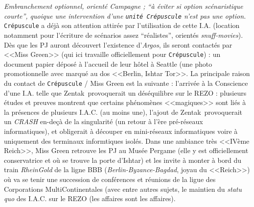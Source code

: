 \documentclass[11pt,twoside,a4paper]{article}
\begin{document}
\emph{Embranchement optionnel, orient{\'e} Campagne ; ``{\`a} {\'e}viter si option sc{\'e}naristique courte'', quoique une intervention d'une \texttt{unit{\'e} Cr{\'e}puscule} n'est pas une option. } \texttt{Cr{\'e}puscule} a d{\'e}j{\`a} son attention attir{\'e}e par l'utilisation de cette I.A. (location notamment pour l'{\'e}criture de sc{\'e}narios assez ``r{\'e}alistes'', orient{\'e}s \emph{snuff-movies}). D{\`e}s que les PJ auront d{\'e}couvert l'existence d'\emph{Argos}, ils seront contact{\'e}s par <<Miss Green>> (qui ici travaille officiellement pour \texttt{Cr{\'e}puscule}) : un document papier d{\'e}pos{\'e} {\`a} l'accueil de leur h{\^o}tel {\`a} Seattle (une photo promotionnelle avec marqu{\'e} au dos <<Berlin, Ishtar Tor>>. La principale raison du contact de \texttt{Cr{\'e}puscule} / Miss Green est la suivante : l'arriv{\'e}e {\`a} la Conscience d'une I.A. telle que Zentak~\texttrademark  provoquerait un d{\'e}s{\'e}quilibre sur le REZO : plusieurs {\'e}tudes et preuves montrent que certains ph{\'e}nom{\`e}nes <<magiques>> sont li{\'e}s {\`a} la pr{\'e}sences de plusieurs I.A.C. (au moins une), l'ajout de Zentak~\texttrademark  provoquerait un \emph{CRASH} en-de\c{c}{\`a} de la singularit{\'e} (un retour {\`a} l'{\`e}re pr{\'e}-r{\'e}seaux informatiques), et obligerait {\`a} d{\'e}couper en mini-r{\'e}seaux informatiques voire {\`a} uniquement des terminaux informtiques isol{\'e}s. Dans une ambiance tr{\`e}s <<IV{\`e}me Reich>>, Miss Green retrouve les PJ au Mus{\'e}e Pergame (elle y est officiellement conservatrice et o{\`u} se trouve la porte d'Ishtar) et les invite {\`a} monter {\`a} bord du train \emph{RheinGold} de la ligne BBB (\emph{Berlin-Byzance-Bagdad}, joyau du <<Reich>>) o{\`u} va se tenir une succession de conf{\'e}rences et r{\'e}unions de la ligue des Corporations MultiContinentales (avec entre autres sujets, le maintien du \emph{statu quo} des I.A.C. sur le REZO (les affaires sont les affaires).     
\end{document}
